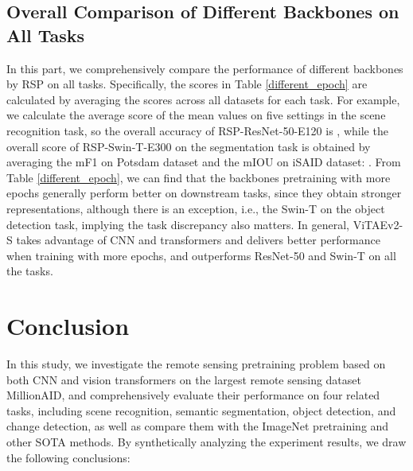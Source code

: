 \documentclass[10pt, journal,twoside]{IEEEtran}
\begin{document}
\subsection{Overall Comparison of Different Backbones on All Tasks}
In this part, we comprehensively compare the performance of different backbones by RSP on all tasks. Specifically, the scores in Table \ref{different_epoch} are calculated by averaging the scores across all datasets for each task. For example, we calculate the average score of the mean values on five settings in the scene recognition task, so the overall accuracy of RSP-ResNet-50-E120 is , while the overall score of RSP-Swin-T-E300 on the segmentation task is obtained by averaging the mF1 on Potsdam dataset and the mIOU on iSAID dataset: . From Table \ref{different_epoch}, we can find that the backbones pretraining with more epochs generally perform better on downstream tasks, since they obtain stronger representations, although there is an exception, i.e., the Swin-T on the object detection task, implying the task discrepancy also matters. In general, ViTAEv2-S takes advantage of CNN and transformers and delivers better performance when training with more epochs, and outperforms ResNet-50 and Swin-T on all the tasks.


\section{Conclusion}

In this study, we investigate the remote sensing pretraining problem based on both CNN and vision transformers on the largest remote sensing dataset MillionAID, and comprehensively evaluate their performance on four related tasks, including scene recognition, semantic segmentation, object detection, and change detection, as well as compare them with the ImageNet pretraining and other SOTA methods. By synthetically analyzing the experiment results, we draw the following conclusions:
\end{document}
